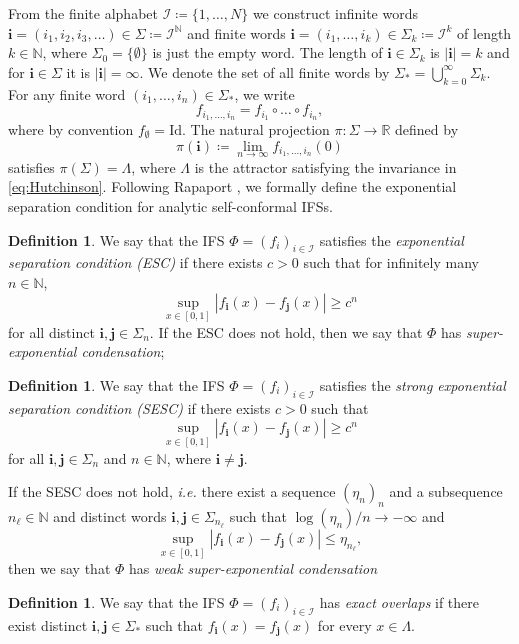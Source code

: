 \documentclass[12pt,]{article}
\def\cref#1{\ref{#1}}%
\theoremstyle{definition}
\newtheorem{definition}[theorem]{Definition}
\theoremstyle{remark}
\renewcommand{\Bbb}[1]{\mathbb{#1}}
\newcommand{\bbN}{{\Bbb N}}         %
\newcommand{\bbR}{{\Bbb R}}        %
\newcommand{\0}{\mathbf{0}}
\newcommand{\ie}{{\it i.e.}\/ }
\newcommand{\bi}{\mathbf{i}}
\newcommand{\bj}{\mathbf{j}}
\begin{document}
{From the finite alphabet $\mathcal{I}\coloneqq\{1,\ldots,N\}$ we construct infinite words
$\bi=(i_1,i_2,i_3,\dots) \in\Sigma \coloneqq \mathcal{I}^{\bbN}$ and finite words
$\bi=(i_1,\ldots,i_k)\in \Sigma_k\coloneqq \mathcal{I}^k$ of length $k\in\mathbb{N}$, where
$\Sigma_0=\{\emptyset\}$ is just the empty word. The length of $\bi\in\Sigma_k$ is $|\bi|=k$ and for
$\bi\in\Sigma$ it is $|\bi|=\infty$. We denote the set of all finite words by $\Sigma_* =
\bigcup_{k=0}^\infty \Sigma_k$. For any finite word $(i_1,\dots,i_n)\in\Sigma_*$, we write
\[
f_{i_1,\dots,i_n} = f_{i_1}\circ \dots \circ f_{i_n},
\]
where by convention $f_{\emptyset}=\mathrm{Id}$. The natural projection $\pi\colon\Sigma\to\bbR$ defined by
\[
\pi(\bi)\coloneqq\lim_{n\to\infty}f_{i_1,\dots,i_n}(0)
\]
satisfies $\pi(\Sigma)=\Lambda$, where $\Lambda$ is the attractor satisfying the invariance in
\cref{eq:Hutchinson}. 
Following Rapaport \cite{Rapaport_SelfConfESC25arXiv}, we formally define the exponential separation
condition for analytic self-conformal IFSs.
\begin{definition}
  We say that the IFS $\Phi=(f_i)_{i\in\mathcal{I}}$ 
  satisfies the \emph{exponential separation condition (ESC)} if there exists $c>0$ such that for
  infinitely many $n\in\mathbb{N}$,
  \[
    \sup_{x\in[0,1]} |f_{\bi}(x)-f_{\bj}(x)| \geq c^n
  \]
  for all distinct $\bi,\bj\in\Sigma_n$. If the ESC does not hold,
  then we say that $\Phi$ has \emph{super-exponential condensation}; 	
\end{definition}
\begin{definition}
  We say that the IFS $\Phi=(f_i)_{i\in\mathcal{I}}$ 
  satisfies the \emph{strong exponential separation condition (SESC)} if there exists $c>0$ such that
  \[
    \sup_{x\in[0,1]} |f_{\bi}(x)-f_{\bj}(x)| \geq c^n
  \]
  for all $\bi,\bj\in\Sigma_n$ and $n\in\bbN$, where $\bi\neq\bj$. 

  If the SESC does not hold, \ie there exist a sequence $(\eta_n)_n$ and a subsequence
  $n_{\ell}\in\bbN$ and distinct words $\bi,\bj\in\Sigma_{n_\ell}$ such that
  $\log(\eta_n)/n\to-\infty$ and
  \[
    \sup_{x\in[0,1]}|f_{\bi}(x)-f_{\bj}(x)| \leq \eta_{n_\ell},
  \]
  then we say that $\Phi$ has \emph{weak super-exponential condensation}
\end{definition}
\begin{definition}
  We say that the IFS $\Phi=(f_i)_{i\in\mathcal{I}}$ 
 has \emph{exact overlaps} if there exist distinct $\bi,\bj\in\Sigma_*$ such that
 $f_{\bi}(x)=f_{\bj}(x)$ for every $x\in\Lambda$. 
\end{definition}

}
\end{document}
